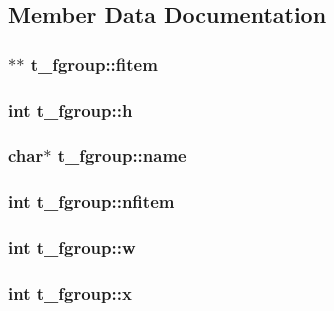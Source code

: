 \subsection{\-Member \-Data \-Documentation}
\hypertarget{structt__fgroup_a986b6c4602edfd2041950a6883055992}{
\subsubsection[{fitem}]{$\ast$$\ast$ {\bf t\-\_\-fgroup\-::fitem}}}\label{structt__fgroup_a986b6c4602edfd2041950a6883055992}
\hypertarget{structt__fgroup_ab76f6a24701e17934a72f15c40296ad2}{
\subsubsection[{h}]{\setlength{\rightskip}{0pt plus 5cm}int {\bf t\-\_\-fgroup\-::h}}}\label{structt__fgroup_ab76f6a24701e17934a72f15c40296ad2}
\hypertarget{structt__fgroup_a5cf1e1055121159dd3d2d370e816070e}{
\subsubsection[{name}]{\setlength{\rightskip}{0pt plus 5cm}char$\ast$ {\bf t\-\_\-fgroup\-::name}}}\label{structt__fgroup_a5cf1e1055121159dd3d2d370e816070e}
\hypertarget{structt__fgroup_a9a1b53eac9e46f47730948f021ef6106}{
\subsubsection[{nfitem}]{\setlength{\rightskip}{0pt plus 5cm}int {\bf t\-\_\-fgroup\-::nfitem}}}\label{structt__fgroup_a9a1b53eac9e46f47730948f021ef6106}
\hypertarget{structt__fgroup_ac3314f8f185907b88412dcd2a720dee3}{
\subsubsection[{w}]{\setlength{\rightskip}{0pt plus 5cm}int {\bf t\-\_\-fgroup\-::w}}}\label{structt__fgroup_ac3314f8f185907b88412dcd2a720dee3}
\hypertarget{structt__fgroup_a2af2c47b5412b70352ac5916cd87b5c1}{
\subsubsection[{x}]{\setlength{\rightskip}{0pt plus 5cm}int {\bf t\-\_\-fgroup\-::x}}}\label{structt__fgroup_a2af2c47b5412b70352ac5916cd87b5c1}
